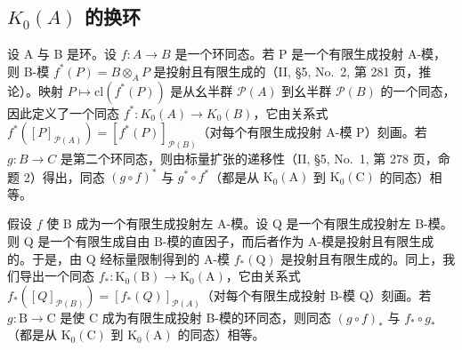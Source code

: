 \subsection{\texorpdfstring{\(K_{0}(A)\) 的换环}{K\_\{0\}(A) 的换环}}

设 A 与 B 是环。设 \(f: A \to B\) 是一个环同态。若 P 是一个有限生成投射 A-模，则 B-模 \(f^{*}(P) = B \otimes_{A} P\) 是投射且有限生成的（II, §5, No.~2, 第 281 页，推论）。映射 \(P \mapsto \text{cl}(f^{*}(P))\) 是从幺半群 \(\mathcal{P}(A)\) 到幺半群 \(\mathcal{P}(B)\) 的一个同态，因此定义了一个同态 \(f^{*}: K_{0}(A) \to K_{0}(B)\)，它由关系式 \(f^{*}([P]_{\mathcal{P}(A)}) = [f^{*}(P)]_{\mathcal{P}(B)}\)（对每个有限生成投射 A-模 P）刻画。若 \(g: B \to C\) 是第二个环同态，则由标量扩张的递移性（II, §5, No.~1, 第 278 页，命题 2）得出，同态 \((g \circ f)^*\) 与 \(g^{*} \circ f^{*}\)（都是从 \(\mathrm{K}_{0}(\mathrm{A})\) 到 \(\mathrm{K}_{0}(\mathrm{C})\) 的同态）相等。

假设 \(f\) 使 B 成为一个有限生成投射左 A-模。设 Q 是一个有限生成投射左 B-模。则 Q 是一个有限生成自由 B-模的直因子，而后者作为 A-模是投射且有限生成的。于是，由 Q 经标量限制得到的 A-模 \(f_{*}(\mathrm{Q})\) 是投射且有限生成的。同上，我们导出一个同态 \(f_{*}: \mathrm{K}_{0}(\mathrm{B}) \to \mathrm{K}_{0}(\mathrm{A})\)，它由关系式 \(f_{*}([Q]_{\mathcal{P}(B)}) = [f_{*}(Q)]_{\mathcal{P}(A)}\)（对每个有限生成投射 B-模 Q）刻画。若 \(g: \mathrm{B} \to \mathrm{C}\) 是使 C 成为有限生成投射 B-模的环同态，则同态 \((g \circ f)_{*}\) 与 \(f_{*} \circ g_{*}\)（都是从 \(\mathrm{K}_{0}(\mathrm{C})\) 到 \(\mathrm{K}_{0}(\mathrm{A})\) 的同态）相等。

